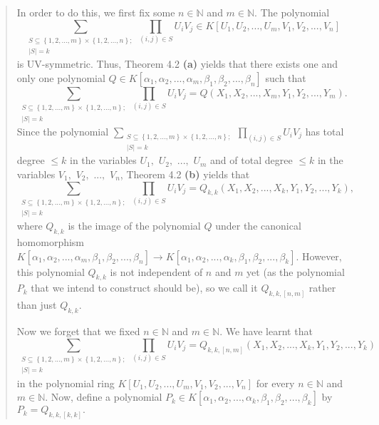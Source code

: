 \documentclass[12pt,final,notitlepage,onecolumn,german]{article}%
\begin{document}
\begin{quote}
In order to do this, we first fix some $n\in\mathbb{N}$ and $m\in\mathbb{N}$.
The polynomial%
\[
\sum_{\substack{S\subseteq\left\{  1,2,...,m\right\}  \times\left\{
1,2,...,n\right\}  ;\\\left\vert S\right\vert =k}}\prod_{\left(  i,j\right)
\in S}U_{i}V_{j}\in K\left[  U_{1},U_{2},...,U_{m},V_{1},V_{2},...,V_{n}%
\right]
\]
is UV-symmetric. Thus, Theorem 4.2 \textbf{(a)} yields that there exists one
and only one polynomial $Q\in K\left[  \alpha_{1},\alpha_{2},...,\alpha
_{m},\beta_{1},\beta_{2},...,\beta_{n}\right]  $ such that%
\[
\sum_{\substack{S\subseteq\left\{  1,2,...,m\right\}  \times\left\{
1,2,...,n\right\}  ;\\\left\vert S\right\vert =k}}\prod_{\left(  i,j\right)
\in S}U_{i}V_{j}=Q\left(  X_{1},X_{2},...,X_{m},Y_{1},Y_{2},...,Y_{m}\right)
.
\]
Since the polynomial $\sum\limits_{\substack{S\subseteq\left\{
1,2,...,m\right\}  \times\left\{  1,2,...,n\right\}  ;\\\left\vert
S\right\vert =k}}\prod_{\left(  i,j\right)  \in S}U_{i}V_{j}$ has total degree
$\leq k$ in the variables $U_{1},$ $U_{2},$ $...,$ $U_{m}$ and of total degree
$\leq k$ in the variables $V_{1},$ $V_{2},$ $...,$ $V_{n}$, Theorem 4.2
\textbf{(b)} yields that%
\[
\sum_{\substack{S\subseteq\left\{  1,2,...,m\right\}  \times\left\{
1,2,...,n\right\}  ;\\\left\vert S\right\vert =k}}\prod_{\left(  i,j\right)
\in S}U_{i}V_{j}=Q_{k,k}\left(  X_{1},X_{2},...,X_{k},Y_{1},Y_{2}%
,...,Y_{k}\right)  ,
\]
where $Q_{k,k}$ is the image of the polynomial $Q$ under the canonical
homomorphism $K\left[  \alpha_{1},\alpha_{2},...,\alpha_{m},\beta_{1}%
,\beta_{2},...,\beta_{n}\right]  \rightarrow K\left[  \alpha_{1},\alpha
_{2},...,\alpha_{k},\beta_{1},\beta_{2},...,\beta_{k}\right]  $. However, this
polynomial $Q_{k,k}$ is not independent of $n$ and $m$ yet (as the polynomial
$P_{k}$ that we intend to construct should be), so we call it $Q_{k,k,\left[
n,m\right]  }$ rather than just $Q_{k,k}$.

Now we forget that we fixed $n\in\mathbb{N}$ and $m\in\mathbb{N}$. We have
learnt that%
\[
\sum_{\substack{S\subseteq\left\{  1,2,...,m\right\}  \times\left\{
1,2,...,n\right\}  ;\\\left\vert S\right\vert =k}}\prod_{\left(  i,j\right)
\in S}U_{i}V_{j}=Q_{k,k,\left[  n,m\right]  }\left(  X_{1},X_{2}%
,...,X_{k},Y_{1},Y_{2},...,Y_{k}\right)
\]
in the polynomial ring $K\left[  U_{1},U_{2},...,U_{m},V_{1},V_{2}%
,...,V_{n}\right]  $ for every $n\in\mathbb{N}$ and $m\in\mathbb{N}$. Now,
define a polynomial $P_{k}\in K\left[  \alpha_{1},\alpha_{2},...,\alpha
_{k},\beta_{1},\beta_{2},...,\beta_{k}\right]  $ by $P_{k}=Q_{k,k,\left[
k,k\right]  }.$


\end{quote}
\end{document}
